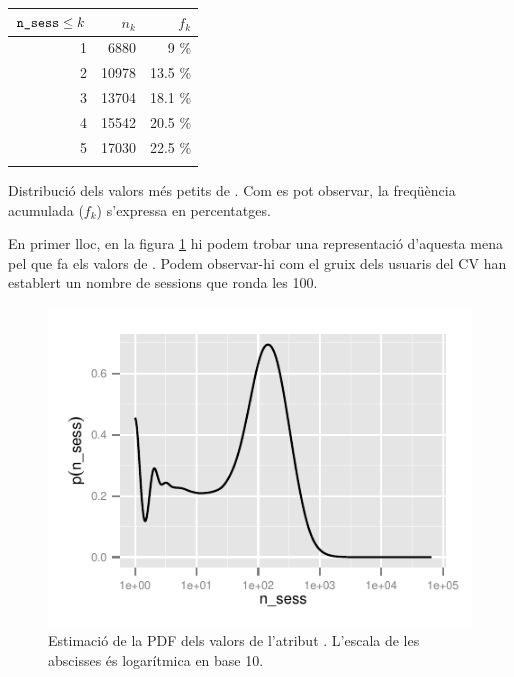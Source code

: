 \documentclass[
	a4paper,
	twoside,
	justified
]{tufte-book}
\begin{document}
\begin{margintable}
    \begin{tabular}{rrr}
    \toprule
    $\texttt{n\_sess} \leq k$ & $n_k$ & $f_k$ \\
    \midrule
    1 & 6880 & 9 \% \\
    2 & 10978 & 13.5 \% \\
    3 & 13704 & 18.1 \% \\
    4 & 15542 & 20.5 \% \\
    5 & 17030 & 22.5 \% \\
    \bottomrule \\
    \end{tabular}
    
    \caption[]{
    \label{tab:n_sess_mins}
    Distribució dels valors més petits de . Com es pot observar, la freqüència acumulada ($f_k$) s'expressa en percentatges.  
    }
  \end{margintable} 

En primer lloc, en la figura \ref{graph:user_n_sessions_density_line_log} hi podem trobar una representació d'aquesta mena pel que fa els valors de . Podem observar-hi com el gruix dels usuaris del CV han establert un nombre de sessions que ronda les 100. 

\begin{figure}
\begin{center}
\includegraphics{user_n_sessions_density_line_log}
\caption{
	\label{graph:user_n_sessions_density_line_log}
	Estimació de la PDF dels valors de l'atribut . L'escala de les abscisses és logarítmica en base 10. 
}
\end{center}
\end{figure}
\end{document}
